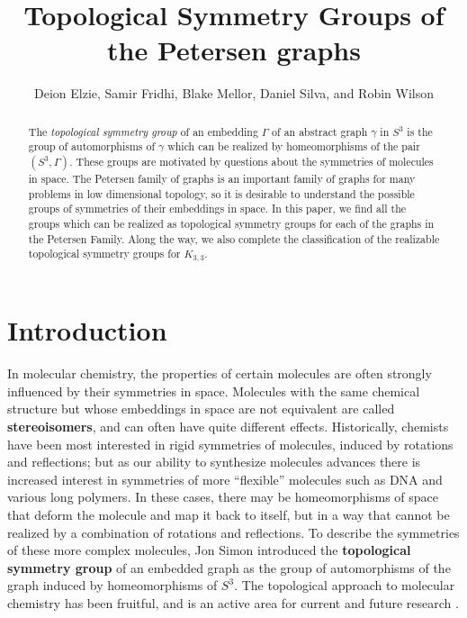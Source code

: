\documentclass[11]{amsart}
\theoremstyle{definition}
\theoremstyle{remark}
\begin{document}
\title{Topological Symmetry Groups of the Petersen graphs}

\author{Deion Elzie, Samir Fridhi, Blake Mellor, Daniel Silva, and Robin Wilson}
\address{Loyola Marymount University, 1 LMU Drive, Los Angeles, CA 90045}
\address{Loyola Marymount University, 1 LMU Drive, Los Angeles, CA 90045}
\begin{abstract} 
The {\em topological symmetry group} of an embedding $\Gamma$ of an abstract graph $\gamma$ in $S^3$ is the group of automorphisms of $\gamma$ which can be realized by homeomorphisms of the pair $(S^3, \Gamma)$.  These groups are motivated by questions about the symmetries of molecules in space.  The Petersen family of graphs is an important family of graphs for many problems in low dimensional topology, so it is desirable to understand the possible groups of symmetries of their embeddings in space.  In this paper, we find all the groups which can be realized as topological symmetry groups for each of the graphs in the Petersen Family. Along the way, we also complete the classification of the realizable topological symmetry groups for $K_{3,3}$.
\end{abstract}

\date{}
\maketitle

\section{Introduction}\label{S:intro}

In molecular chemistry, the properties of certain molecules are often strongly influenced by their symmetries in space. Molecules with the same chemical structure but whose embeddings in space are not equivalent are called {\bf stereoisomers}, and can often have quite different effects. Historically, chemists have been most interested in rigid symmetries of molecules, induced by rotations and reflections; but as our ability to synthesize molecules advances there is increased interest in symmetries of more ``flexible'' molecules such as DNA and various long polymers.  In these cases, there may be homeomorphisms of space that deform the molecule and map it back to itself, but in a way that cannot be realized by a combination of rotations and reflections. To describe the symmetries of these more complex molecules, Jon Simon \cite{si} introduced the {\bf topological symmetry group} of an embedded graph as the group of automorphisms of the graph induced by homeomorphisms of $S^3$. The topological approach to molecular chemistry has been fruitful, and is an active area for current and future research \cite{f3, ro}.
\end{document}
